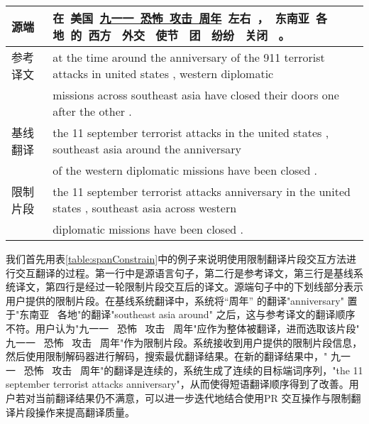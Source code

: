 \documentclass[master, winfont]{njuthesis}
\begin{document}
\begin{table*}[!htb]
\begin{center}
\footnotesize
\begin{tabular}{l|l}
\hline
    源端 &在~美国~\underline{九一一~恐怖~攻击~周年}~左右~，~东南亚~各地~的~西方 ~外交 ~使节 ~团~ 纷纷~ 关闭 ~。\\
\hline
    参考译文& at the time around the anniversary of the 911 terrorist attacks in united states , western diplomatic\\& missions across southeast asia have closed their doors one after the other .\\
\hline
    基线翻译& the 11 september terrorist attacks in the united states , southeast asia around the anniversary\\& of the western diplomatic missions have been closed .\\
\hline
    限制片段& the 11 september terrorist attacks anniversary in the united states , southeast asia across western \\&diplomatic missions have been closed .\\
\hline
\end{tabular}
\end{center}
\caption{\label{table:spanConstrain} 限制翻译片段交互的例子}
\end{table*}

我们首先用表\ref{table:spanConstrain}中的例子来说明使用限制翻译片段交互方法进行交互翻译的过程。第一行中是源语言句子，第二行是参考译文，第三行是基线系统译文，第四行是经过一轮限制片段交互后的译文。源端句子中的下划线部分表示用户提供的限制片段。在基线系统翻译中，系统将“周年” 的翻译"anniversary" 置于"东南亚~ 各地"的翻译"southeast asia around" 之后，这与参考译文的翻译顺序不符。用户认为"九一一~ 恐怖~ 攻击~ 周年"应作为整体被翻译，进而选取该片段" 九一一~ 恐怖~ 攻击~ 周年"作为限制片段。系统接收到用户提供的限制片段信息，然后使用限制解码器进行解码，搜索最优翻译结果。在新的翻译结果中，" 九一一~ 恐怖~ 攻击~ 周年"的翻译是连续的，系统生成了连续的目标端词序列，"the 11 september terrorist attacks anniversary"，从而使得短语翻译顺序得到了改善。用户若对当前翻译结果仍不满意，可以进一步迭代地结合使用PR 交互操作与限制翻译片段操作来提高翻译质量。
\end{document}
